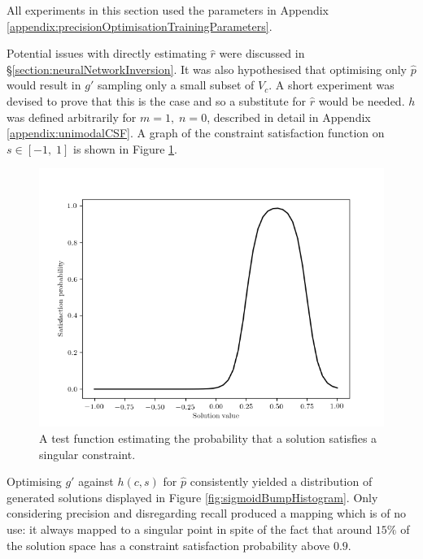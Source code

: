 \documentclass[../../main.tex]{subfiles}
\begin{document}
All experiments in this section used the parameters in Appendix \ref{appendix:precisionOptimisationTrainingParameters}.

Potential issues with directly estimating $\hat{r}$ were discussed in \S\ref{section:neuralNetworkInversion}.
It was also hypothesised that optimising only $\hat{p}$ would result in $g'$ sampling only a small subset of $V_c$.
A short experiment was devised to prove that this is the case and so a substitute for $\hat{r}$ would be needed.
$h$ was defined arbitrarily for $m=1,\;n=0$, described in detail in Appendix \ref{appendix:unimodalCSF}.
A graph of the constraint satisfaction function on $s\in[-1,\;1]$ is shown in Figure \ref{fig:sigmoidBumpFunction}.
\begin{figure}[H]
    \begin{center}
    \includegraphics[width=\textwidth]{sigmoidBumpFunction}
    \caption[Arbitrary constraint satisfaction function]{
        A test function estimating the probability that a solution satisfies a singular constraint.
    }
    \label{fig:sigmoidBumpFunction}
    \end{center}
\end{figure}
Optimising $g'$ against $h(c,s)$ for $\hat{p}$ consistently yielded a distribution of generated solutions displayed in Figure \ref{fig:sigmoidBumpHistogram}.
Only considering precision and disregarding recall produced a mapping which is of no use: it always mapped to a singular point in spite of the fact that around $15\%$ of the solution space has a constraint satisfaction probability above $0.9$.
\end{document}
